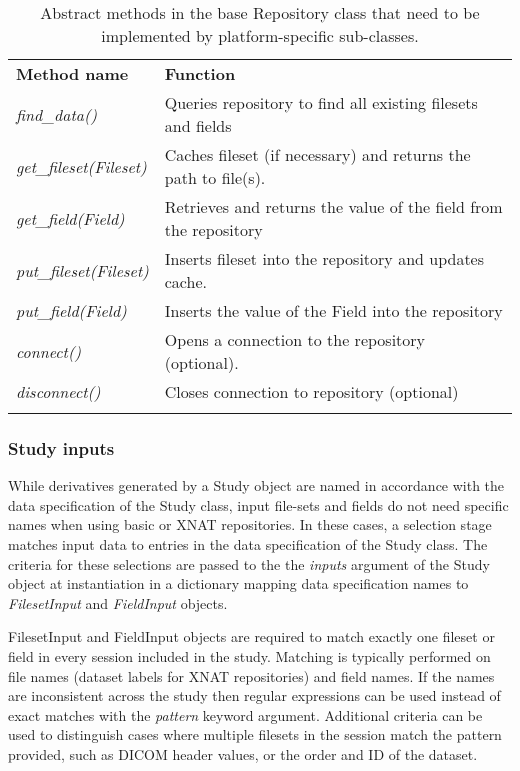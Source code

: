\documentclass[smallextended]{svjour3}       %
\begin{document}
\begin{table}
\caption{Abstract methods in the base Repository class that
need to be implemented by platform-specific sub-classes.}
\label{tbl:abstract-repo-methods} 
\begin{tabular}{ll}
\hline\noalign{\smallskip}
\textbf{Method name} & \textbf{Function} \\
\noalign{\smallskip}\hline\noalign{\smallskip}
\emph{find\_data()} & Queries repository to find all existing filesets and
fields \\
\emph{get\_fileset(Fileset)} & Caches fileset (if necessary) and returns the path to file(s). \\
\emph{get\_field(Field)} & Retrieves and returns the value of the field from
the repository \\
\emph{put\_fileset(Fileset)} & Inserts fileset into the repository and updates cache. \\
\emph{put\_field(Field)} & Inserts the value of the Field into the repository \\
\emph{connect()} & Opens a connection to the repository (optional). \\
\emph{disconnect()} & Closes connection to repository (optional)\\
\noalign{\smallskip}\hline
\end{tabular}
\end{table}

\subsubsection*{Study inputs}
\label{study-inputs}

While derivatives generated by a Study object are named in accordance
with the data specification of the Study class, input file-sets and fields
do not need specific names when using basic or XNAT
repositories. In these cases, a selection stage matches input data to
entries in the data specification of the Study class. The criteria for
these selections are passed to the
the \emph{inputs} argument of the Study object at instantiation in a
dictionary mapping data specification names to \emph{FilesetInput} and
\emph{FieldInput} objects.

FilesetInput and FieldInput objects are required
to match exactly one fileset or field in every session included in the study.
Matching is typically performed on file
names (dataset labels for XNAT repositories) and field names. If the
names are inconsistent across the study then regular expressions can be
used instead of exact matches with the \emph{pattern} keyword argument.
Additional criteria can be used to distinguish cases where multiple
filesets in the session match the pattern provided, such as DICOM
header values, or the order and ID of the dataset.
\end{document}
